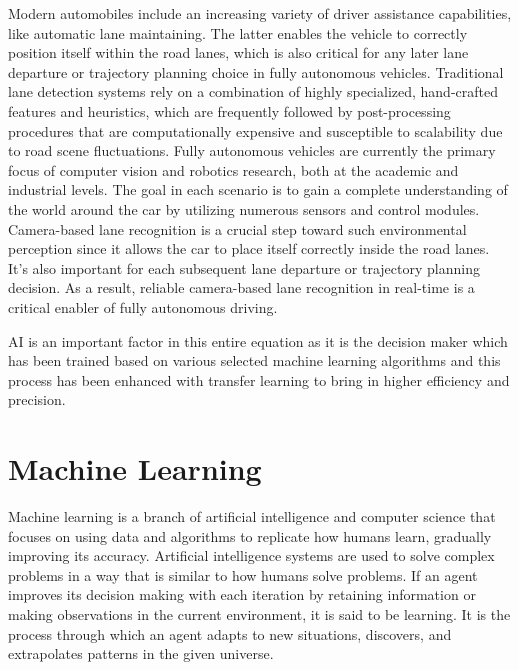 Modern automobiles include an increasing variety of driver assistance capabilities, like automatic lane maintaining. The latter enables the vehicle to correctly position itself within the road lanes, which is also critical for any later lane departure or trajectory planning choice in fully autonomous vehicles. Traditional lane detection systems rely on a combination of highly specialized, hand-crafted features and heuristics, which are frequently followed by post-processing procedures that are computationally expensive and susceptible to scalability due to road scene fluctuations. Fully autonomous vehicles are currently the primary focus of computer vision and robotics research, both at the academic and industrial levels. The goal in each scenario is to gain a complete understanding of the world around the car by utilizing numerous sensors and control modules. Camera-based lane recognition is a crucial step toward such environmental perception since it allows the car to place itself correctly inside the road lanes. It's also important for each subsequent lane departure or trajectory planning decision. As a result, reliable camera-based lane recognition in real-time is a critical enabler of fully autonomous driving.\cite{neven_towards_2018}

AI is an important factor in this entire equation as it is the decision maker which has been trained based on various selected machine learning algorithms and this process has been enhanced with transfer learning to bring in higher efficiency and precision. 

\section{Machine Learning}


Machine learning is a branch of artificial intelligence and computer science that focuses on using data and algorithms to replicate how humans learn, gradually improving its accuracy. Artificial intelligence systems are used to solve complex problems in a way that is similar to how humans solve problems. If an agent improves its decision making with each iteration by retaining information or making observations in the current environment, it is said to be learning. It is the process through which an agent adapts to new situations, discovers, and extrapolates patterns in the given universe. 


